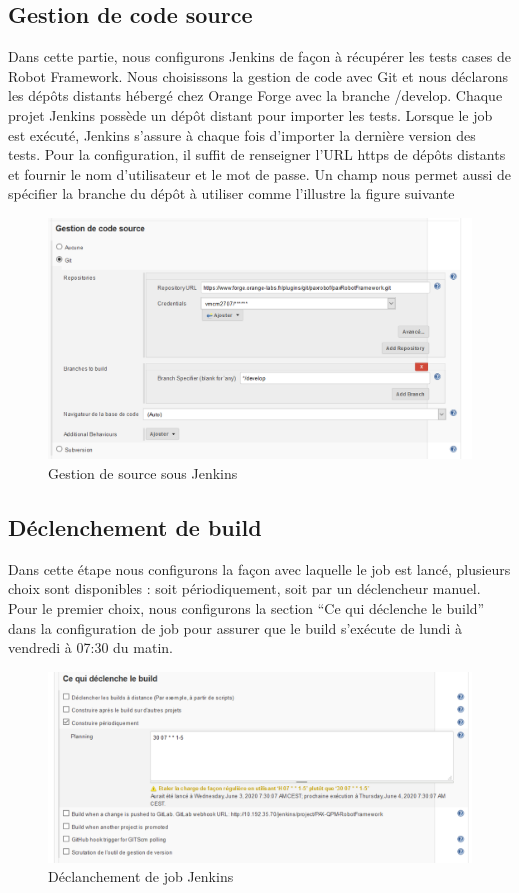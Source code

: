 \subsection{Gestion de code source}
Dans cette partie, nous configurons Jenkins de façon à récupérer les tests cases de Robot Framework. Nous choisissons la gestion de code avec Git et nous déclarons les dépôts distants hébergé chez Orange Forge avec la branche /develop. Chaque projet Jenkins possède un dépôt distant pour importer les tests. Lorsque le job est exécuté, Jenkins s’assure à chaque fois d’importer la dernière version des tests. Pour la configuration, il suffit de renseigner l’URL https de dépôts distants et fournir le nom d’utilisateur et le mot de passe. Un champ nous permet aussi de spécifier la branche du dépôt à utiliser comme l'illustre la figure suivante
\begin{figure}[H]
	\centering
	\includegraphics[width=0.7\linewidth]{img/jenkins/source}
	\caption[Gestion de source sous Jenkins]{Gestion de source sous Jenkins}
	\label{fig:source-jenkins}
\end{figure}

\subsection{Déclenchement de build }
Dans cette étape nous configurons la façon avec laquelle le job est lancé, plusieurs choix sont disponibles : soit périodiquement, soit par un déclencheur manuel.\\
Pour le premier choix, nous configurons la section “Ce qui déclenche le build” dans la configuration de job pour assurer que le build s'exécute de lundi à vendredi à 07:30 du matin.
\begin{figure}[H]
	\centering
	\includegraphics[width=0.8\linewidth]{img/jenkins/declanchement}
	\caption[Déclanchement de job Jenkins]{Déclanchement de job Jenkins}
	\label{fig:declanchement}
\end{figure}

